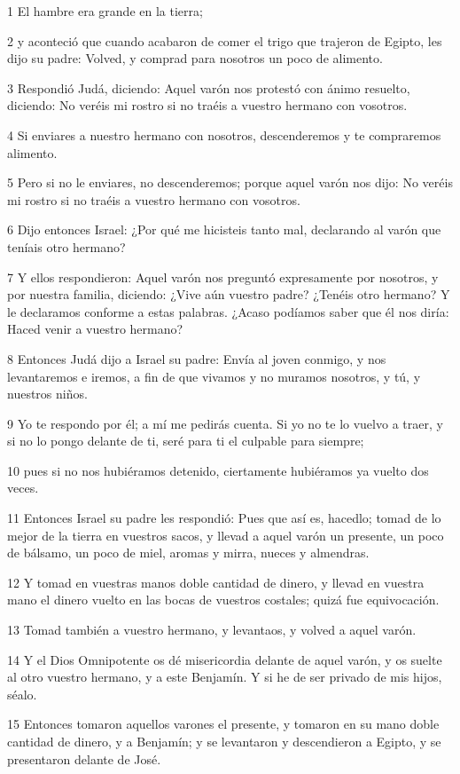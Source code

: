 \par 1 El hambre era grande en la tierra;
\par 2 y aconteció que cuando acabaron de comer el trigo que trajeron de Egipto, les dijo su padre: Volved, y comprad para nosotros un poco de alimento.
\par 3 Respondió Judá, diciendo: Aquel varón nos protestó con ánimo resuelto, diciendo: No veréis mi rostro si no traéis a vuestro hermano con vosotros.
\par 4 Si enviares a nuestro hermano con nosotros, descenderemos y te compraremos alimento.
\par 5 Pero si no le enviares, no descenderemos; porque aquel varón nos dijo: No veréis mi rostro si no traéis a vuestro hermano con vosotros.
\par 6 Dijo entonces Israel: ¿Por qué me hicisteis tanto mal, declarando al varón que teníais otro hermano?
\par 7 Y ellos respondieron: Aquel varón nos preguntó expresamente por nosotros, y por nuestra familia, diciendo: ¿Vive aún vuestro padre? ¿Tenéis otro hermano? Y le declaramos conforme a estas palabras. ¿Acaso podíamos saber que él nos diría: Haced venir a vuestro hermano?
\par 8 Entonces Judá dijo a Israel su padre: Envía al joven conmigo, y nos levantaremos e iremos, a fin de que vivamos y no muramos nosotros, y tú, y nuestros niños.
\par 9 Yo te respondo por él; a mí me pedirás cuenta. Si yo no te lo vuelvo a traer, y si no lo pongo delante de ti, seré para ti el culpable para siempre;
\par 10 pues si no nos hubiéramos detenido, ciertamente hubiéramos ya vuelto dos veces.
\par 11 Entonces Israel su padre les respondió: Pues que así es, hacedlo; tomad de lo mejor de la tierra en vuestros sacos, y llevad a aquel varón un presente, un poco de bálsamo, un poco de miel, aromas y mirra, nueces y almendras.
\par 12 Y tomad en vuestras manos doble cantidad de dinero, y llevad en vuestra mano el dinero vuelto en las bocas de vuestros costales; quizá fue equivocación.
\par 13 Tomad también a vuestro hermano, y levantaos, y volved a aquel varón.
\par 14 Y el Dios Omnipotente os dé misericordia delante de aquel varón, y os suelte al otro vuestro hermano, y a este Benjamín. Y si he de ser privado de mis hijos, séalo.
\par 15 Entonces tomaron aquellos varones el presente, y tomaron en su mano doble cantidad de dinero, y a Benjamín; y se levantaron y descendieron a Egipto, y se presentaron delante de José.
